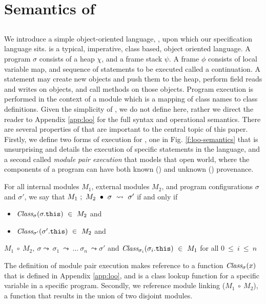 \section{Semantics of \Chainmail}
\label{s:semantics}

\subsection{\Loo}
We introduce a simple object-oriented language, \Loo, upon 
which our specification language sits. \Loo is a typical, imperative,
class based, object oriented language. A \Loo program $\sigma$ consists of a 
heap $\chi$, and a frame stack $\psi$. A frame $\phi$ consists of
local variable map, and sequence of statements to be executed called 
a continuation. A statement may create new objects and push them to the heap, 
perform field reads and writes on objects, and call methods on those objects. 
Program execution is performed in the context of a module which is a mapping
of class names to class definitions. Given the simplicity of \Loo, we do not
define \Loo here, rather we direct the reader to Appendix \ref{app:loo} for 
the full syntax and operational semantics. There are several properties 
of \Loo that are important to the central topic of this paper. Firstly,
we define two forms of execution for \Loo, one in Fig. \ref{f:loo-semantics}
that is unsurprising and details the execution of specific 
statements in the language, and a second called \emph{module pair execution} 
that models that open world, where the components of a program can
have both known (\internalO) and unknown (\externalO) provenance.
\begin{definition}
\label{def:pair-reduce}
For all internal modules $M_1$, external modules $M_2$, and program configurations $\sigma$ and $\sigma'$, 
we say that $M_1\ ;\ M_2\ \bullet\ \sigma\ \leadsto\ \sigma'$ if and only if
\begin{itemize}
\item
$\class{\sigma}{\sigma.\texttt{this}}\ \in\ M_2$ and
\item
$\class{\sigma'}{\sigma'.\texttt{this}}\ \in\ M_2$ and 
\end{itemize} 
$M_1\ \circ\ M_2,\ \sigma \leadsto\ \sigma_1\ \leadsto\ \ldots\ \sigma_n\ \leadsto \sigma'$ and $\class{\sigma_i}{\sigma_i.\texttt{this}}\ \in\ M_1$ for all $0\ \leq\ i\ \leq\ n$
\end{definition}
The definition of module pair execution makes reference to a function
$\textit{Class}_{\sigma}(x)$ that is defined in Appendix \ref{app:loo}, and
is a class lookup function for a specific variable in a specific program.
Secondly, we reference module linking ($M_1\ \circ\ M_2$), a function
that results in the union of two disjoint modules.

